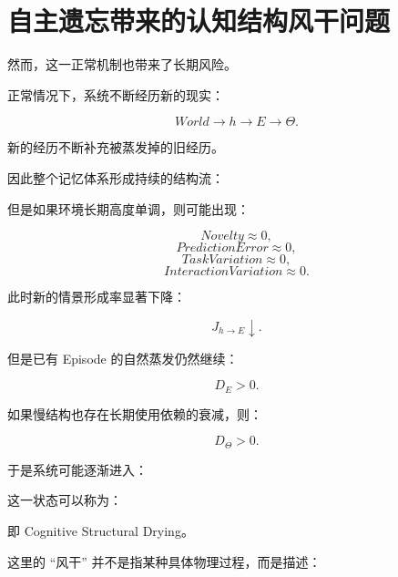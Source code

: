 \section{自主遗忘带来的认知结构风干问题}

然而，这一正常机制也带来了长期风险。

正常情况下，系统不断经历新的现实：

\[
World
\rightarrow
h
\rightarrow
E
\rightarrow
\Theta.
\]

新的经历不断补充被蒸发掉的旧经历。

因此整个记忆体系形成持续的结构流：

\begin{statementbox}
\centering
{}
\end{statementbox}

但是如果环境长期高度单调，则可能出现：

\[
Novelty\approx 0,
\]
\[
PredictionError\approx 0,
\]
\[
TaskVariation\approx 0,
\]
\[
InteractionVariation\approx 0.
\]

此时新的情景形成率显著下降：

\[
J_{h\rightarrow E}\downarrow.
\]

但是已有 Episode 的自然蒸发仍然继续：

\[
D_E>0.
\]

如果慢结构也存在长期使用依赖的衰减，则：

\[
D_\Theta>0.
\]

于是系统可能逐渐进入：

\begin{statementbox}
\centering
{}
\end{statementbox}

这一状态可以称为：

\begin{statementbox}
\centering
{}
\end{statementbox}

即 Cognitive Structural Drying。

这里的 ``风干'' 并不是指某种具体物理过程，而是描述：

\begin{statementbox}
\centering
{}
\end{statementbox}

